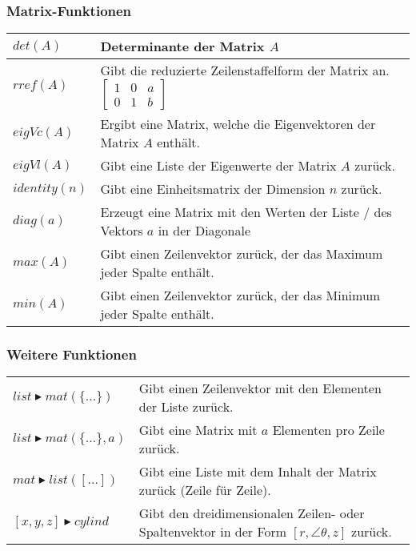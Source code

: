 \subsubsection{Matrix-Funktionen}
\begin{tabular}{|l|l|}
	\hline
	$det(A)$						& Determinante der Matrix $A$ \\ \hline
	$rref(A)$						& Gibt die reduzierte Zeilenstaffelform der Matrix an. $\begin{bmatrix}1&0&a \\ 0&1&b\end{bmatrix}$ \\ \hline
	$eigVc(A)$						& Ergibt eine Matrix, welche die Eigenvektoren der Matrix $A$ enthält. \\ \hline
	$eigVl(A)$						& Gibt eine Liste der Eigenwerte der Matrix $A$ zurück. \\ \hline
	$identity(n)$					& Gibt eine Einheitsmatrix der Dimension $n$ zurück. \\ \hline
	$diag(a)$						& Erzeugt eine Matrix mit den Werten der Liste / des Vektors $a$ in der Diagonale \\ \hline
	$max(A)$						& Gibt einen Zeilenvektor zurück, der das Maximum jeder Spalte enthält. \\ \hline
	$min(A)$						& Gibt einen Zeilenvektor zurück, der das Minimum jeder Spalte enthält. \\ \hline
\end{tabular}

\subsubsection{Weitere Funktionen}
\begin{tabular}{|l|l|}
	\hline
	$list \blacktriangleright mat(\{...\})$			& Gibt einen Zeilenvektor mit den Elementen der Liste zurück. \\
	$list \blacktriangleright mat(\{...\},a)$		& Gibt eine Matrix mit $a$ Elementen pro Zeile zurück.\\ \hline
	$mat \blacktriangleright list([...])$			& Gibt eine Liste mit dem Inhalt der Matrix zurück (Zeile für Zeile). \\ \hline
	$[x,y,z] \blacktriangleright cylind$			& Gibt den dreidimensionalen Zeilen- oder Spaltenvektor in der Form $[r, \angle \theta , z ]$ zurück. \\ \hline
\end{tabular}